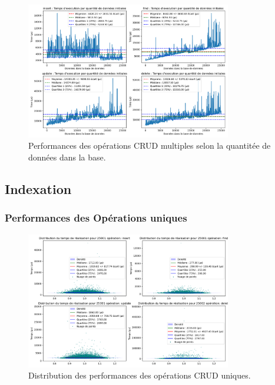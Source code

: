 \documentclass[12pt,a4paper]{report}
\begin{document}
        \begin{figure}[H]
            \centering
            \includegraphics[width=0.8\textwidth]{../plots/MongoDB/replica_set/test_many_various_data.png}
            \caption{Performances des opérations CRUD multiples selon la quantitée de données dans la base.}
            \label{fig:mongo_replica_many_various}
        \end{figure}

        \subsection{Indexation}
        
            \subsubsection{Performances des Opérations uniques}

                \begin{figure}[H]
                    \centering
                    \includegraphics[width=0.8\textwidth]{../plots/MongoDB/replica_set_indexed/global_test_one.png}
                    \caption{Distribution des performances des opérations CRUD uniques.}
                    \label{fig:mongo_replica_global_one_indexed}
                \end{figure}
\end{document}
